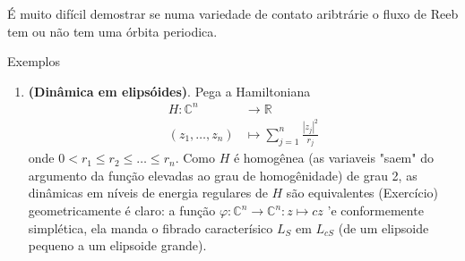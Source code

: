 \begin{remark}\leavevmode
	É muito difícil demostrar se numa variedade de contato aribtrárie o fluxo de Reeb tem ou não tem uma órbita periodica.
\end{remark}

\begin{thing4}{Exemplos}\leavevmode
\begin{enumerate}
\item \textbf{(Dinâmica em elipsóides)}.\hspace{1em} Pega a Hamiltoniana
	\begin{align*}
		H: \mathbb{C}^n &\longrightarrow \mathbb{R} \\
		(z_1,\ldots,z_n) &\longmapsto \sum_{j=1}^n\frac{|z_j|^2}{r_j}
	\end{align*}
onde $0<r_1\leq r_2\leq \ldots\leq r_n$. Como $H$ é homogênea (as variaveis "saem" do argumento da função elevadas ao grau de homogênidade) de grau 2, as dinâmicas em níveis de energia regulares de $H$ são equivalentes {\color{3}(Exercício) geometricamente é claro: a função $\varphi:\mathbb{C}^{n}\to \mathbb{C}^{n}:z\mapsto cz$ 'e conformemente simplética, ela manda o fibrado caracterísico $L_S$ em  $L_{cS}$ (de um elipsoide pequeno a um elipsoide grande)}.


\end{enumerate}
\end{thing4}
